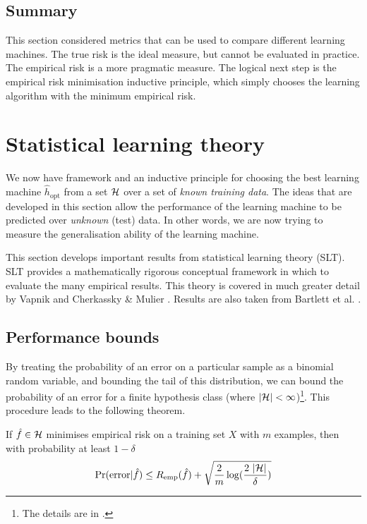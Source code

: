 \subsection{Summary}

This section considered metrics that can be used to compare different
learning machines.  The true risk is the ideal measure, but cannot be
evaluated in practice.  The empirical risk is a more pragmatic
measure.  The logical next step is the empirical risk minimisation
inductive principle, which simply chooses the learning algorithm with
the minimum empirical risk.





\section{Statistical learning theory}
\label{sec:slt}

We now have framework and an inductive principle for choosing the
best learning machine $\hat{h}_{\mbox{opt}}$ from a set $\mathcal{H}$ over a
set of \emph{known training data}.  The ideas that are developed in
this section allow the performance of the learning machine to be
predicted over \emph{unknown} (test) data.  In other words, we are now
trying to measure the generalisation ability of the learning machine.

This section develops important results from statistical learning
theory (SLT).  SLT provides a mathematically rigorous
conceptual framework in which to evaluate the many empirical results.
This theory is covered in much greater detail by Vapnik
\cite{Vapnik98} and Cherkassky \& Mulier \cite{Cherkassky98}.  Results
are also taken from Bartlett et al. \cite{Bartlett98a}.

\subsection{Performance bounds}

By treating the probability of an error on a particular sample as a
binomial random variable, and bounding the tail of this distribution,
we can bound the probability of an error for a finite hypothesis class
(where $|\mathcal{H}| < \infty$)\footnote{The details are in
\cite{Bartlett99b}.}.  This procedure leads to the following theorem.

\begin{theorem}
If $\hat{f} \in \mathcal{H}$ minimises empirical risk on a training set $X$
with $m$ examples, then with probability at least $1 - \delta$
%
\begin{equation}
\Pr(\mathrm{error}|\hat{f}) \leq R_{\mathrm{emp}}(\hat{f}) + \sqrt{\frac{2}{m}
\log (\frac{2\  |\mathcal{H}|}{\delta})}
\end{equation}
\end{theorem}

